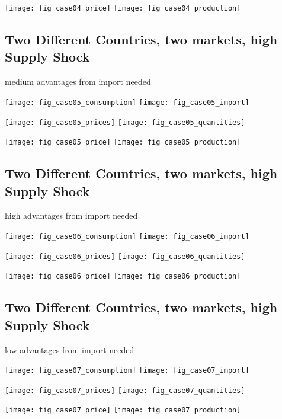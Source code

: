 \documentclass{article}
\begin{document}
\noindent
\vskip-5mm
\hskip-1cm
\texttt{[image: fig\_case04\_price]}
\texttt{[image: fig\_case04\_production]}

\newpage

\subsection{Two Different Countries, two markets, high Supply Shock}
medium advantages from import needed

\vskip2mm
\hskip-1cm
\texttt{[image: fig\_case05\_consumption]}
\texttt{[image: fig\_case05\_import]}

\noindent
\vskip-5mm
\hskip-1cm
\texttt{[image: fig\_case05\_prices]}
\texttt{[image: fig\_case05\_quantities]}

\noindent
\vskip-5mm
\hskip-1cm
\texttt{[image: fig\_case05\_price]}
\texttt{[image: fig\_case05\_production]}

\newpage

\subsection{Two Different Countries, two markets, high Supply Shock}
high advantages from import needed

\vskip2mm
\hskip-1cm
\texttt{[image: fig\_case06\_consumption]}
\texttt{[image: fig\_case06\_import]}

\noindent
\vskip-5mm
\hskip-1cm
\texttt{[image: fig\_case06\_prices]}
\texttt{[image: fig\_case06\_quantities]}

\noindent
\vskip-5mm
\hskip-1cm
\texttt{[image: fig\_case06\_price]}
\texttt{[image: fig\_case06\_production]}

\newpage

\subsection{Two Different Countries, two markets, high Supply Shock}
low advantages from import needed

\vskip2mm
\hskip-1cm
\texttt{[image: fig\_case07\_consumption]}
\texttt{[image: fig\_case07\_import]}

\noindent
\vskip-5mm
\hskip-1cm
\texttt{[image: fig\_case07\_prices]}
\texttt{[image: fig\_case07\_quantities]}

\noindent
\vskip-5mm
\hskip-1cm
\texttt{[image: fig\_case07\_price]}
\texttt{[image: fig\_case07\_production]}

\newpage
\end{document}
